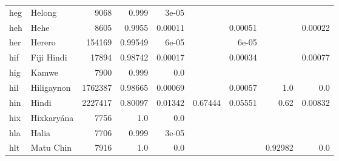 \documentclass[11pt]{article}
\begin{document}
\begin{table*}[h]
{\begin{tabular}{llrrrrrrr}
heg         & Helong         & 9068         & 0.999         & 3e-05         &          &          &          &          \\

heh         & Hehe         & 8605         & 0.9955         & 0.00011         &          & 0.00051         &          & 0.00022         \\

her         & Herero         & 154169         & 0.99549         & 6e-05         &          & 6e-05         &          &          \\

hif         & Fiji Hindi         & 17894         & 0.98742         & 0.00017         &          & 0.00034         &          & 0.00077         \\

hig         & Kamwe         & 7900         & 0.999         & 0.0         &          &          &          &          \\

hil         & Hiligaynon         & 1762387         & 0.98665         & 0.00069         &          & 0.00057         & 1.0         & 0.0         \\

hin         & Hindi         & 2227417         & 0.80097         & 0.01342         & 0.67444         & 0.05551         & 0.62         & 0.00832         \\

hix         & Hixkaryána         & 7756         & 1.0         & 0.0         &          &          &          &          \\

hla         & Halia         & 7706         & 0.999         & 3e-05         &          &          &          &          \\

hlt         & Matu Chin         & 7916         & 1.0         & 0.0         &          &          & 0.92982         & 0.0         \\


\end{tabular}}
\end{table*}
\end{document}
